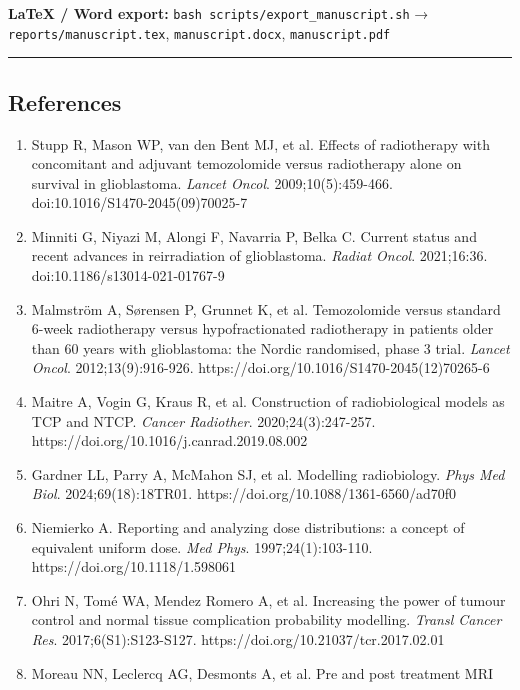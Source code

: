 \documentclass[
  11pt,
]{article}
\begin{document}
\textbf{LaTeX / Word export:}
\texttt{bash\ scripts/export\_manuscript.sh} →
\texttt{reports/manuscript.tex}, \texttt{manuscript.docx},
\texttt{manuscript.pdf}

\begin{center}\rule{0.5\linewidth}{0.5pt}\end{center}

\subsection{References}\label{references}

\begin{enumerate}
\def\labelenumi{\arabic{enumi}.}
\item
  Stupp R, Mason WP, van den Bent MJ, et al. Effects of radiotherapy
  with concomitant and adjuvant temozolomide versus radiotherapy alone
  on survival in glioblastoma. \emph{Lancet Oncol}. 2009;10(5):459-466.
  doi:10.1016/S1470-2045(09)70025-7
\item
  Minniti G, Niyazi M, Alongi F, Navarria P, Belka C. Current status and
  recent advances in reirradiation of glioblastoma. \emph{Radiat Oncol}.
  2021;16:36. doi:10.1186/s13014-021-01767-9
\item
  Malmström A, Sørensen P, Grunnet K, et al. Temozolomide versus
  standard 6-week radiotherapy versus hypofractionated radiotherapy in
  patients older than 60 years with glioblastoma: the Nordic randomised,
  phase 3 trial. \emph{Lancet Oncol}. 2012;13(9):916-926.
  https://doi.org/10.1016/S1470-2045(12)70265-6
\item
  Maitre A, Vogin G, Kraus R, et al. Construction of radiobiological
  models as TCP and NTCP. \emph{Cancer Radiother}. 2020;24(3):247-257.
  https://doi.org/10.1016/j.canrad.2019.08.002
\item
  Gardner LL, Parry A, McMahon SJ, et al. Modelling radiobiology.
  \emph{Phys Med Biol}. 2024;69(18):18TR01.
  https://doi.org/10.1088/1361-6560/ad70f0
\item
  Niemierko A. Reporting and analyzing dose distributions: a concept of
  equivalent uniform dose. \emph{Med Phys}. 1997;24(1):103-110.
  https://doi.org/10.1118/1.598061
\item
  Ohri N, Tomé WA, Mendez Romero A, et al. Increasing the power of
  tumour control and normal tissue complication probability modelling.
  \emph{Transl Cancer Res}. 2017;6(S1):S123-S127.
  https://doi.org/10.21037/tcr.2017.02.01
\item
  Moreau NN, Leclercq AG, Desmonts A, et al. Pre and post treatment MRI

\end{enumerate}
\end{document}
